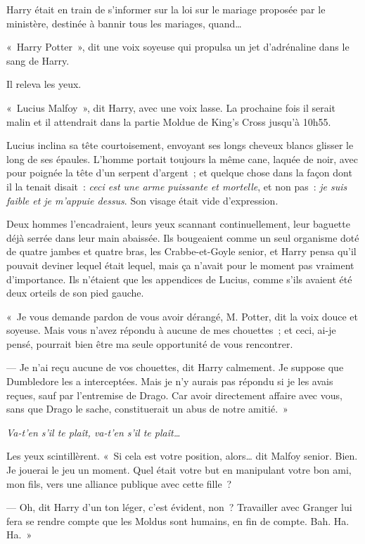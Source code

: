 Harry était en train de s'informer sur la loi sur le mariage proposée par le ministère, destinée à bannir tous les mariages, quand…

«~Harry Potter~», dit une voix soyeuse qui propulsa un jet d'adrénaline dans le sang de Harry.

Il releva les yeux.

«~Lucius Malfoy~», dit Harry, avec une voix lasse. La prochaine fois il serait malin et il attendrait dans la partie Moldue de King's Cross jusqu'à 10h55.

Lucius inclina sa tête courtoisement, envoyant ses longs cheveux blancs glisser le long de ses épaules. L'homme portait toujours la même cane, laquée de noir, avec pour poignée la tête d'un serpent d'argent~; et quelque chose dans la façon dont il la tenait disait~: \emph{ceci est une arme puissante et mortelle}, et non pas~: \emph{je suis faible et je m'appuie dessus}. Son visage était vide d'expression.

Deux hommes l'encadraient, leurs yeux scannant continuellement, leur baguette déjà serrée dans leur main abaissée. Ils bougeaient comme un seul organisme doté de quatre jambes et quatre bras, les Crabbe-et-Goyle senior, et Harry pensa qu'il pouvait deviner lequel était lequel, mais ça n'avait pour le moment pas vraiment d'importance. Ils n'étaient que les appendices de Lucius, comme s'ils avaient été deux orteils de son pied gauche.

«~Je vous demande pardon de vous avoir dérangé, M. Potter, dit la voix douce et soyeuse. Mais vous n'avez répondu à aucune de mes chouettes~; et ceci, ai-je pensé, pourrait bien être ma seule opportunité de vous rencontrer.

--- Je n'ai reçu aucune de vos chouettes, dit Harry calmement. Je suppose que Dumbledore les a interceptées. Mais je n'y aurais pas répondu si je les avais reçues, sauf par l'entremise de Drago. Car avoir directement affaire avec vous, sans que Drago le sache, constituerait un abus de notre amitié.~»

\emph{Va-t'en s'il te plaît, va-t'en s'il te plaît…}

Les yeux scintillèrent. «~Si cela est votre position, alors… dit Malfoy senior. Bien. Je jouerai le jeu un moment. Quel était votre but en manipulant votre bon ami, mon fils, vers une alliance publique avec cette fille~?

--- Oh, dit Harry d'un ton léger, c'est évident, non~? Travailler avec Granger lui fera se rendre compte que les Moldus sont humains, en fin de compte. Bah. Ha. Ha.~»


